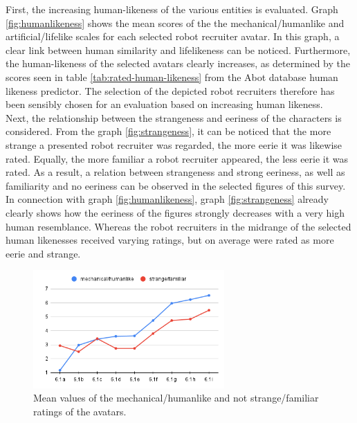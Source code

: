 First, the increasing human-likeness of the various entities is evaluated. Graph \ref{fig:humanlikeness} shows the mean scores of the the mechanical/humanlike and artificial/lifelike scales for each selected robot recruiter avatar. In this graph, a clear link between human similarity and lifelikeness can be noticed. Furthermore, the human-likeness of the selected avatars clearly increases, as determined by the scores seen in table \ref{tab:rated-human-likeness} from the Abot database human likeness predictor. The selection of the depicted robot recruiters therefore has been sensibly chosen for an evaluation based on increasing human likeness.\\
Next, the relationship between the strangeness and eeriness of the characters is considered. From the graph \ref{fig:strangeness}, it can be noticed that the more strange a presented robot recruiter was regarded, the more eerie it was likewise rated. Equally, the more familiar a robot recruiter appeared, the less eerie it was rated. As a result, a relation between strangeness and strong eeriness, as well as familiarity and no eeriness can be observed in the selected figures of this survey. In connection with graph \ref{fig:humanlikeness}, graph \ref{fig:strangeness} already clearly shows how the eeriness of the figures strongly decreases with a very high human resemblance. Whereas the robot recruiters in the midrange of the selected human likenesses received varying ratings, but on average were rated as more eerie and strange.\par
\begin{figure} %
    \centering
    \includegraphics[width=0.65\textwidth]{graphics/result/result3.png}
    \caption{Mean values of the mechanical/humanlike and not strange/familiar ratings of the avatars.}
    \label{fig:uncanny_valley_result}
\end{figure}
